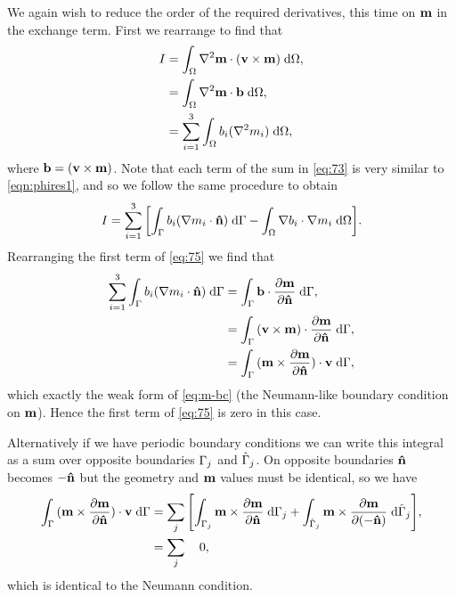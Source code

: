 {We again wish to reduce the order of the required derivatives, this time on $\mv$ in the exchange term.
First we rearrange to find that
\begin{equation}
  \begin{aligned}
    I &= \intd{\lap \mv \cdot (\testv \times \mv)}, \\
      &= \intd{\lap \mv \cdot \bv}, \\
      &= \sum_{i=1}^3 \intd{ b_i (\lap m_i)},
  \end{aligned}
\label{eq:73}
\end{equation}
where $\bv = (\testv \times \mv)$.
Note that each term of the sum in \cref{eq:73} is very similar to \cref{eqn:phires1}, and so we follow the same procedure to obtain
\begin{equation}
  I = \sum_{i=1}^3 \bigs{\intb{b_i (\grad m_i \cdot \nv)} - \intd{\grad b_i \cdot \grad m_i}}.
\label{eq:75}
\end{equation}
Rearranging the first term of \cref{eq:75} we find that
\begin{equation}
  \begin{aligned}
    \sum_{i=1}^3 \intb{b_i (\grad m_i \cdot \nv)}
    &= \intb{\bv \cdot \pd{\mv}{\nv}}, \\
    &=  \intb{(\testv \times \mv) \cdot \pd{\mv}{\nv}}, \\
    &=  \intb{(\mv \times \pd{\mv}{\nv}) \cdot \testv},
  \end{aligned}
\end{equation}
which exactly the weak form of \cref{eq:m-bc} (the Neumann-like boundary condition on $\mv$).
Hence the first term of \cref{eq:75} is zero in this case.

Alternatively if we have periodic boundary conditions we can write this integral as a sum over opposite boundaries $\boundd_j$ and $\hat{\boundd}_j$.
On opposite boundaries $\nv$ becomes $-\nv$ but the geometry and $\mv$ values must be identical, so we have
\begin{equation}
  \begin{aligned}
    \intb{(\mv \times \pd{\mv}{\nv}) \cdot \testv}
    &= \sum_j \bigs{\intd[\boundd_j]{\mv \times \pd{\mv}{\nv}}
    + \intd[\hat{\boundd}_j]{\mv \times \pd{\mv}{(-\nv)}}}, \\
    & = \sum_j \quad 0 ,
  \end{aligned}
\end{equation}
which is identical to the Neumann condition.

}
